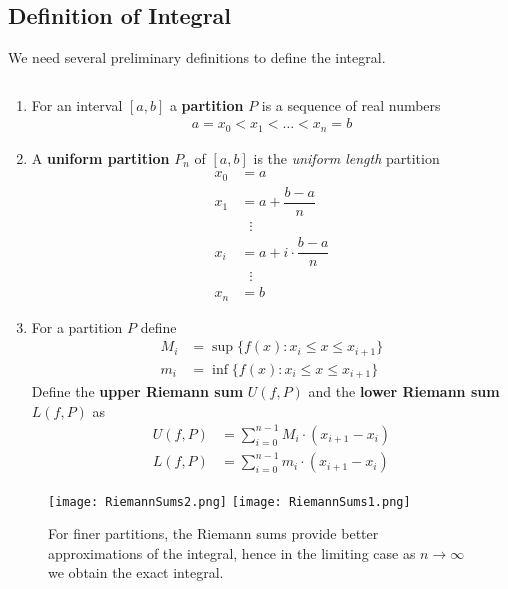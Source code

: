 \subsection{Definition of Integral}
We need several preliminary definitions to define the integral.
\begin{definition}$ $
	\begin{enumerate}
		\item For an interval $[a,b]$ a {\bf partition} $P$ is a sequence of real numbers
		      \begin{align*}
			      a = x_0 < x_1 < \dots < x_n = b
		      \end{align*}
		\item A {\bf uniform partition} $P_n$ of $[a,b]$ is the {\it uniform length} partition
		      \begin{align*}
			      x_0 & = a                          \\
			      x_1 & = a + \dfrac{b-a}{n}         \\
			          & \:\:\: \vdots                \\
			      x_i & = a + i \cdot \dfrac{b-a}{n} \\
			          & \:\:\: \vdots                \\
			      x_n & = b
		      \end{align*}
		\item For a partition $P$ define
		      \begin{align*}
			      M_i & = \sup \{ f(x) : x_i \le x \le x_{i+1}\} \\
			      m_i & = \inf \{ f(x) : x_i \le x \le x_{i+1}\}
		      \end{align*}
		      Define the {\bf upper Riemann sum} $U(f,P)$ and the {\bf lower Riemann sum} $L(f,P)$ as
		      \begin{align*}
			      U(f,P) & = \sum \limits_{i=0}^{n-1} M_i \cdot (x_{i+1} - x_i) \\
			      L(f,P) & = \sum \limits_{i=0}^{n-1} m_i \cdot (x_{i+1} - x_i)
		      \end{align*}
	\end{enumerate}
\end{definition}
\begin{figure}[H]
	\centering
	\texttt{[image: RiemannSums2.png]}
	\texttt{[image: RiemannSums1.png]}
	\caption*{For finer partitions, the Riemann sums provide better approximations of the integral, hence in the limiting case as $n\rightarrow \infty$ we obtain the exact integral.}
\end{figure}
